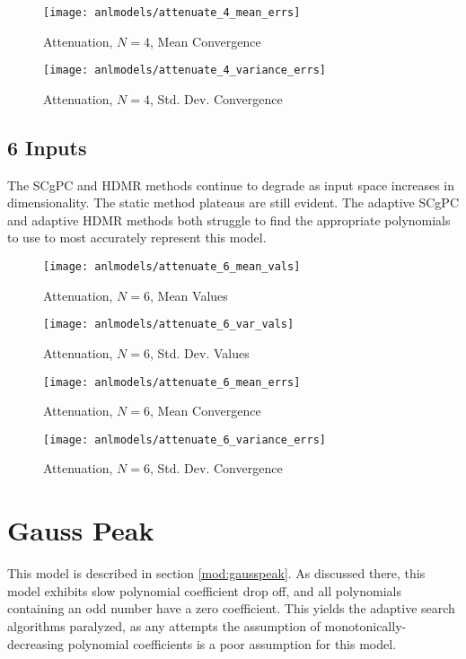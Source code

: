 \begin{figure}[H]
  \centering
  \texttt{[image: anlmodels/attenuate\_4\_mean\_errs]}
  \caption{Attenuation, $N=4$, Mean Convergence}
  \label{fig:attenuate mean errors 4}
\end{figure}
\begin{figure}[H]
  \centering
  \texttt{[image: anlmodels/attenuate\_4\_variance\_errs]}
  \caption{Attenuation, $N=4$, Std. Dev. Convergence}
  \label{fig:attenuate var errors 4}
\end{figure}

\subsection{6 Inputs}
The SCgPC and HDMR methods continue to degrade as input space increases in dimensionality.  The static method
plateaus are still evident.  The adaptive SCgPC and adaptive HDMR methods both struggle to find the
appropriate polynomials to use to most accurately represent this model.
\begin{figure}[H]
  \centering
  \texttt{[image: anlmodels/attenuate\_6\_mean\_vals]}
  \caption{Attenuation, $N=6$, Mean Values}
  \label{fig:attenuate mean values 6}
\end{figure}
\begin{figure}[H]
  \centering
  \texttt{[image: anlmodels/attenuate\_6\_var\_vals]}
  \caption{Attenuation, $N=6$, Std. Dev. Values}
  \label{fig:attenuate var values 6}
\end{figure}

\begin{figure}[H]
  \centering
  \texttt{[image: anlmodels/attenuate\_6\_mean\_errs]}
  \caption{Attenuation, $N=6$, Mean Convergence}
  \label{fig:attenuate mean errors 6}
\end{figure}
\begin{figure}[H]
  \centering
  \texttt{[image: anlmodels/attenuate\_6\_variance\_errs]}
  \caption{Attenuation, $N=6$, Std. Dev. Convergence}
  \label{fig:attenuate var errors 6}
\end{figure}


\section{Gauss Peak}
This model is described in section \ref{mod:gausspeak}.
As discussed there, this model exhibits slow polynomial coefficient drop off, and all polynomials containing
an odd number have a zero coefficient.  This yields the adaptive search algorithms paralyzed, as any attempts
the assumption of monotonically-decreasing polynomial coefficients is a poor assumption for this model.
